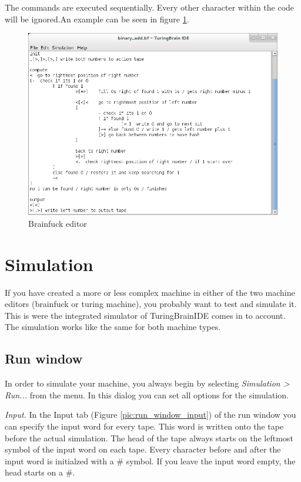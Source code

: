 \documentclass[%
  a4paper,%
  11pt,%
  blue,%
  hyperref	%
  ]{tubsartcl}
\begin{document}
\bigskip
The commands are executed sequentially. Every other character within the code will be ignored.An example can be seen in figure \ref{pic:brainfuck_editor}.

\begin{figure}[!htb]
\begin{center}
\includegraphics[scale=0.5]{graphics_gui/brainfuck_editor.png}
\end{center}
\caption{Brainfuck editor}
\label{pic:brainfuck_editor}
\end{figure}

\clearpage

\section{Simulation}

If you have created a more or less complex machine in either of the two machine editors (brainfuck or turing machine), you probably want to test and simulate it. This is were the integrated simulator of TuringBrainIDE comes in to account. The simulation works like the same for both machine types.

\subsection{Run window}
In order to simulate your machine, you always begin by selecting \emph{Simulation > Run...} from the menu. In this dialog you can set all options for the simulation.

\emph{Input.} In the Input tab (Figure \ref{pic:run_window_input}) of the run window you can specify the input word for every tape. This word is written onto the tape before the actual simulation. The head of the tape always starts on the leftmost symbol of the input word on each tape. Every character before and after the input word is initialzed with a \# symbol. If you leave the input word empty, the head starts on a \#. 
\end{document}
